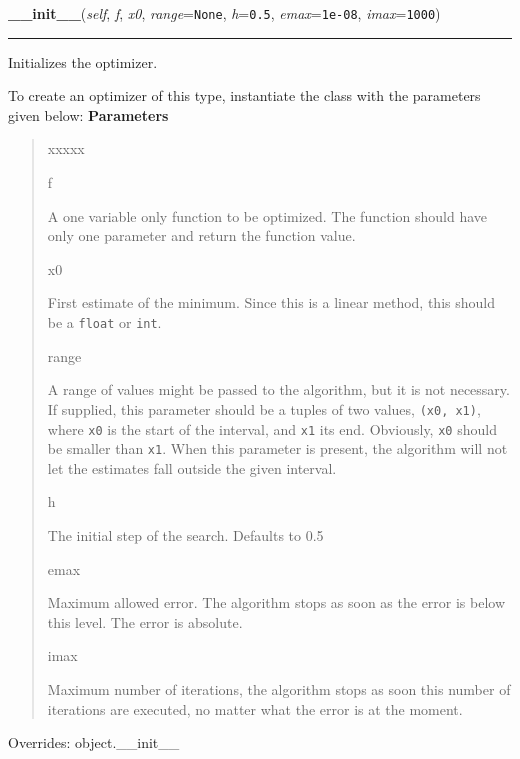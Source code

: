 \hspace{.8\funcindent}\begin{boxedminipage}{\funcwidth}

    \raggedright \textbf{\_\_init\_\_}(\textit{self}, \textit{f}, \textit{x0}, \textit{range}={\tt None}, \textit{h}={\tt 0.5}, \textit{emax}={\tt 1e-08}, \textit{imax}={\tt 1000})

    \vspace{-1.5ex}

    \rule{\textwidth}{0.5\fboxrule}
\setlength{\parskip}{2ex}

Initializes the optimizer.

To create an optimizer of this type, instantiate the class with the
parameters given below:
\setlength{\parskip}{1ex}
      \textbf{Parameters}
      \vspace{-1ex}

      \begin{quote}
        \begin{Ventry}{xxxxx}

          \item[f]


A one variable only function to be optimized. The function should
have only one parameter and return the function value.
          \item[x0]


First estimate of the minimum. Since this is a linear method, this
should be a \texttt{float} or \texttt{int}.
          \item[range]


A range of values might be passed to the algorithm, but it is not
necessary. If supplied, this parameter should be a tuples of two
values, \texttt{(x0, x1)}, where \texttt{x0} is the start of the interval, and
\texttt{x1} its end. Obviously, \texttt{x0} should be smaller than \texttt{x1}.
When this parameter is present, the algorithm will not let the
estimates fall outside the given interval.
          \item[h]


The initial step of the search. Defaults to 0.5
          \item[emax]


Maximum allowed error. The algorithm stops as soon as the error is
below this level. The error is absolute.
          \item[imax]


Maximum number of iterations, the algorithm stops as soon this
number of iterations are executed, no matter what the error is at
the moment.
        \end{Ventry}

      \end{quote}

      Overrides: object.\_\_init\_\_

    \end{boxedminipage}

